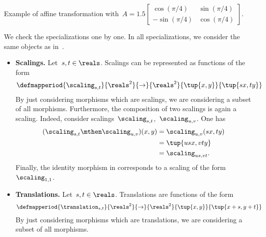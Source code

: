\begin{solution}
    \begin{marginfigure}
        \begin{center}
        \end{center}
        \caption{Example of affine transformation with~$A=1.5\begin{bmatrix}\cos(\pi/4)&\sin(\pi/4)\\-\sin(\pi/4)&\cos(\pi/4)\end{bmatrix}$.}
    \end{marginfigure}
    We check the specializations one by one.
    In all specializations, we consider the same objects as in~\Draw.
    \begin{itemize}
        \item \textbf{Scalings.}
              Let~$s,t\in \reals$.
              Scalings can be represented as functions of the form
              \begin{equation*}
                  \defmapperiod{\scaling_{s,t}}{\reals^2}{\to}{\reals^2}{\tup{x,y}}{\tup{s x,t y}}
              \end{equation*}
              By just considering morphisms which are scalings, we are considering a subset of all morphisms.
              Furthermore, the composition of two scalings is again a scaling.
              Indeed, consider scalings~$\scaling_{s,t}$,~$\scaling_{u,v}$.
              One has
              \begin{equation*}
                  \begin{aligned}
                      (\scaling_{s,t}\mthen \scaling_{u,v})(x,y) & =\scaling_{u,v}(sx, ty) \\
                                                                 & =\tup{usx, vty} \\
                                                                 & =\scaling_{us,vt}.
                  \end{aligned}
              \end{equation*}
              Finally, the identity morphism in \Draw corresponds to a scaling of the form~$\scaling_{1,1}$.
        \item \textbf{Translations.}
              Let~$s,t\in \reals$.
              Translations are functions of the form
              \begin{equation*}
                  \defmapperiod{\translation_{s,t}}{\reals^2}{\to}{\reals^2}{\tup{x,y}}{\tup{x+s,y+t}}
              \end{equation*}
              By just considering morphisms which are translations, we are considering a subset of all morphisms.

\end{itemize}
\end{solution}
